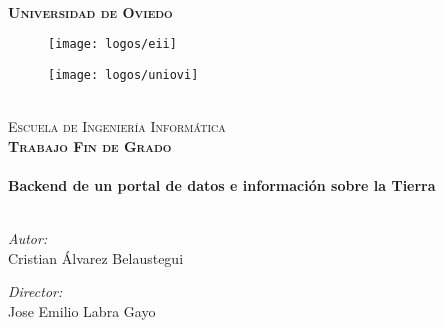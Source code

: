 \begin{titlepage}
\begin{center}



~\\[2cm]
\textsc{\textbf{\LARGE Universidad de Oviedo}}\\[.5cm]

\begin{figure}
\centering
\begin{minipage}{.5\textwidth}
  \centering
  \texttt{[image: logos/eii]}
\end{minipage}%
\begin{minipage}{.5\textwidth}
  \centering
  \texttt{[image: logos/uniovi]}
\end{minipage}
\end{figure}

~\\[1cm]

\textsc{\Large Escuela de Ingeniería Informática}\\[1cm]

\textsc{\textbf{\Large Trabajo Fin de Grado}}\\[1.5cm]

~\\[1cm]
{ \huge \bfseries Backend de un portal de datos e información sobre la Tierra \\[0.4cm] }
~\\[6cm]

\begin{minipage}{0.4\textwidth}
	\begin{flushleft} \large
		\emph{Autor:}\\
		Cristian Álvarez Belaustegui
	\end{flushleft}
\end{minipage}
\begin{minipage}{0.4\textwidth}
	\begin{flushright} \large
		\emph{Director:} \\
		Jose Emilio Labra Gayo
	\end{flushright}
\end{minipage}

\vfill

\end{center}
\end{titlepage}